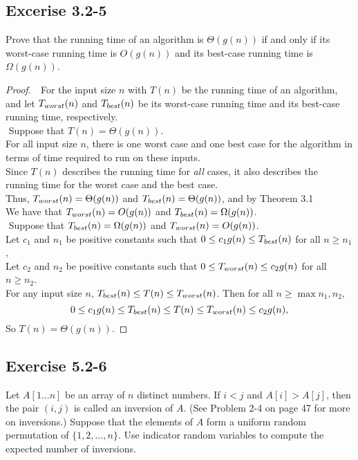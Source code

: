 \documentclass{article}
\begin{document}
\subsection*{Excerise 3.2-5}
Prove that the running time of an algorithm is $ \Theta(g(n)) $ if and only if its worst-case
running time is $ O(g(n)) $ and its best-case running time is $ \Omega(g(n)) $.
\begin{proof}
    $ $\newline
    $ $\newline
    For the input size $n$ with $T(n)$ be the running time of an algorithm, 
    and let $T_{worst}(n)$ and $T_{best}(n)$ be its worst-case running time and its best-case running time, respectively. \\
    $ $\newline
    Suppose that $T(n)=\Theta(g(n))$. \\
    For all input size $n$, there is one worst case and one best case for the algorithm 
    in terms of time required to run on these inputs. \\
    Since $T(n)$ describes the running time for \emph{all} cases, it also describes the 
    running time for the worst case and the best case. \\
    Thus, $T_{worst}(n)=\Theta(g(n))$ and $T_{best}(n)=\Theta(g(n))$, and by Theorem 3.1 \\
    We have that $T_{worst}(n)=O(g(n))$ and $T_{best}(n)=\Omega(g(n))$. \\
    $ $\newline
    Suppose that $T_{best}(n)=\Omega(g(n))$ and $T_{worst}(n)=O(g(n))$. \\
    Let $c_1$ and $n_1$ be positive constants such that $0\le c_1g(n)\le T_{best}(n)$ for all $n\ge n_1$, \\
    Let $c_2$ and $n_2$ be positive constants such that $0\le T_{worst}(n)\le c_2g(n)$ for all $n\ge n_2$. \\
    For any input size $n$, $T_{best}(n)\le T(n)\le T_{worst}(n)$.
    Then for all $n\ge\max{n_1,n_2}$,
    \[
        0 \le c_1g(n) \le T_{best}(n) \le T(n) \le T_{worst}(n) \le c_2g(n),
    \]
    So $T(n)=\Theta(g(n))$.
\end{proof}

\clearpage %
\subsection*{Exercise 5.2-6}
Let $A[1 \ldots n]$ be an array of $n$ distinct numbers. If $i < j$ and $A[i] > A[j]$, 
then the pair $(i, j)$ is called an inversion of $A$. 
(See Problem 2-4 on page 47 for more on inversions.) 
Suppose that the elements of $A$ form a uniform random permutation of $\{1, 2, \ldots, n\}$. 
Use indicator random variables to compute the expected number of inversions.
\end{document}
